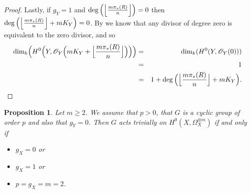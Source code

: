 \documentclass[11pt]{article} %
\newtheorem{prop}{Proposition}
\begin{document}
\begin{proof}
Lastly, if $g_Y=1$ and $\deg\Big(\Big{\lfloor}\frac{m\pi_*(R)}{n}\Big{\rfloor}\Big)=0$ then $\deg\Big(\Big{\lfloor}\frac{m\pi_*(R)}{n}\Big{\rfloor}+mK_Y\Big)=0$. By \citep[Chap. IV,\ Example 1.3.6]{hart} we know that any divisor of degree zero is equivalent to the zero divisor, and so
\begin{eqnarray*}
\mbox{dim}_k\Big(H^0\Big(Y,\mathscr{O}_Y\Big(mK_Y+\Big{\lfloor}{\frac{m\pi_*(R)}{n}}\Big{\rfloor} \Big)\Big)\Big) &= & \mbox{dim}_k(H^0(Y,\mathscr{O}_Y(0))) \\ 
& = & 1 \\
& = & 1+\deg\Big(\Big{\lfloor}\frac{m\pi_*(R)}{n}\Big{\rfloor}+mK_Y\Big).
\end{eqnarray*}
\end{proof}

\begin{prop}
Let $m\geq 2$. We assume that $p>0$, that $G$ is a cyclic group of order $p$ and also that $g_Y=0$. Then $G$ acts trivially on $H^0(X,\Omega_X^{\otimes m})$ if and only if
	\begin{itemize}
		\item
			$g_X=0$ or
		\item
			$g_X=1$ or
		\item
			$p=g_X=m=2$.
	\end{itemize}
\end{prop}
\end{document}
